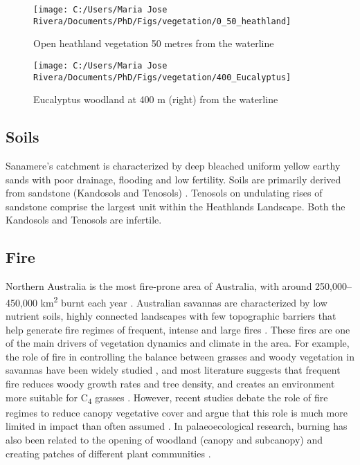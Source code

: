 \documentclass[
  12pt,
]{book}
\begin{document}
\begin{figure}

{\centering \texttt{[image: C:/Users/Maria Jose Rivera/Documents/PhD/Figs/vegetation/0\_50\_heathland]} 

}

\caption{Open heathland vegetation 50 metres from the waterline}\label{fig:fig-veg1}
\end{figure}



\begin{figure}

{\centering \texttt{[image: C:/Users/Maria Jose Rivera/Documents/PhD/Figs/vegetation/400\_Eucalyptus]} 

}

\caption{Eucalyptus woodland at 400 m (right) from the waterline}\label{fig:fig-veg3}
\end{figure}



\hypertarget{soils}{%
\subsection{Soils}\label{soils}}

Sanamere's catchment is characterized by deep bleached uniform yellow earthy sands with poor drainage, flooding and low fertility. Soils are primarily derived from sandstone (Kandosols and Tenosols) \citep{biggsSoilsCapeYork1995}. Tenosols on undulating rises of sandstone comprise the largest unit within the Heathlands Landscape. Both the Kandosols and Tenosols are infertile.

\hypertarget{fire}{%
\subsection{Fire}\label{fire}}

Northern Australia is the most fire‐prone area of Australia, with around 250,000--450,000 km\textsuperscript{2} burnt each year \citep{russell-smithFireManagementBusiness2016}. Australian savannas are characterized by low nutrient soils, highly connected landscapes with few topographic barriers that help generate fire regimes of frequent, intense and large fires \citep{stevensSavannaWoodyEncroachment2017}. These fires are one of the main drivers of vegetation dynamics and climate in the area. For example, the role of fire in controlling the balance between grasses and woody vegetation in savannas have been widely studied \citep{lehmannDecipheringDistributionSavanna2011}, and most literature suggests that frequent fire reduces woody growth rates and tree density, and creates an environment more suitable for C\textsubscript{4} grasses \citep{lehmannDecipheringDistributionSavanna2011}. However, recent studies debate the role of fire regimes to reduce canopy vegetative cover and argue that this role is much more limited in impact than often assumed \citep{veenendaalRelationshipFireRegime2018}. In palaeoecological research, burning has also been related to the opening of woodland (canopy and subcanopy) and creating patches of different plant communities \citep{roweLateHoloceneSwamp2015}.
\end{document}
